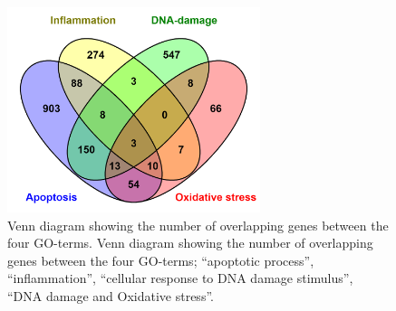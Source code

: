 \documentclass[ijms,article,submit,moreauthors,pdftex]{Definitions/mdpi}
\begin{document}




\appendixstart
\appendix
\section{}

\begin{figure}[ht!]
\includegraphics[height=6cm,keepaspectratio]{figA1.png}
\caption{Venn diagram showing the number of overlapping genes between the four GO-terms.
Venn diagram showing the number of overlapping genes between the four GO-terms; “apoptotic process”, “inflammation”, “cellular response to DNA damage stimulus”, “DNA damage and Oxidative stress”.
}
\label{fig:figA1}
\end{figure}
\end{document}

